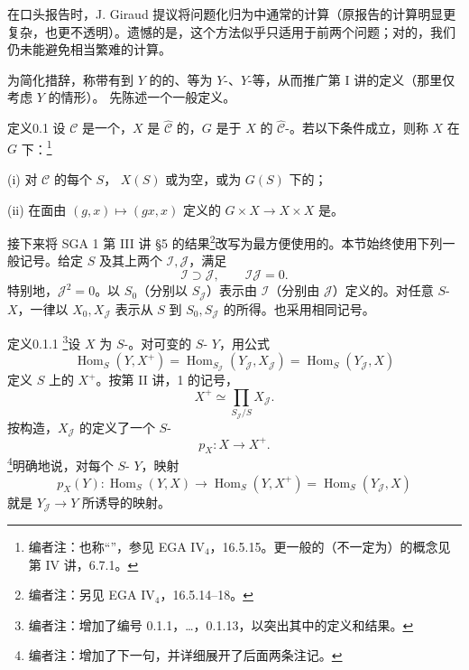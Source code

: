 在口头报告时，J. Giraud 提议将问题化归为中通常的计算（原报告的计算明显更复杂，也更不透明）。遗憾的是，这个方法似乎只适用于前两个问题；对的，我们仍未能避免相当繁难的计算。

为简化措辞，称带有到 $Y$ 的的、等为 $Y$-、$Y$-等，从而推广第 I 讲的定义（那里仅考虑 $Y$ 的情形）。
先陈述一个一般定义。
\begin{SGAresult}{定义}{0.1}
设 $\mathscr C$ 是一个，$X$ 是 $\widehat{\mathscr C}$ 的，$G$ 是于 $X$ 的 $\widehat{\mathscr C}$-。若以下条件成立，则称 $X$ 在 $G$ 下：\footnote{编者注：也称“”，参见 EGA IV$_4$，16.5.15。更一般的（不一定为）的概念见第 IV 讲，6.7.1。}

(i) 对 $\mathscr C$ 的每个 $S$， $X(S)$ 或为空，或为 $G(S)$ 下的；

(ii) 在面由 $(g,x)\mapsto(gx,x)$ 定义的 $G\times X\to X\times X$ 是。
\end{SGAresult}
接下来将 SGA 1 第 III 讲 §5 的结果\footnote{编者注：另见 EGA IV$_4$，16.5.14--18。}改写为最方便使用的。本节始终使用下列一般记号。给定 $S$ 及其上两个 $\mathcal I,\mathcal J$，满足
\[\mathcal I\supset\mathcal J,\qquad\mathcal I\mathcal J=0.\]
特别地，$\mathcal J^2=0$。以 $S_0$（分别以 $S_{\mathcal J}$）表示由 $\mathcal I$（分别由 $\mathcal J$）定义的。对任意 $S$- $X$，一律以 $X_0,X_{\mathcal J}$ 表示从 $S$ 到 $S_0,S_{\mathcal J}$ 的所得。也采用相同记号。
\begin{SGAresult}{定义}{0.1.1}
\footnote{编者注：增加了编号 0.1.1，\ldots，0.1.13，以突出其中的定义和结果。}设 $X$ 为 $S$-。对可变的 $S$- $Y$，用公式
\[\operatorname{Hom}_S(Y,X^+)=\operatorname{Hom}_{S_{\mathcal J}}(Y_{\mathcal J},X_{\mathcal J})=\operatorname{Hom}_S(Y_{\mathcal J},X)\]
定义 $S$ 上的 $X^+$。按第 II 讲，1 的记号，
\[X^+\simeq\prod_{S_{\mathcal J}/S}X_{\mathcal J}.\]
按构造，$X_{\mathcal J}$ 的定义了一个 $S$-
\[p_X:X\longrightarrow X^+.\]
\footnote{编者注：增加了下一句，并详细展开了后面两条注记。}明确地说，对每个 $S$- $Y$，映射
\[p_X(Y):\operatorname{Hom}_S(Y,X)\longrightarrow\operatorname{Hom}_S(Y,X^+)=\operatorname{Hom}_S(Y_{\mathcal J},X)\]
就是 $Y_{\mathcal J}\to Y$ 所诱导的映射。
\end{SGAresult}
